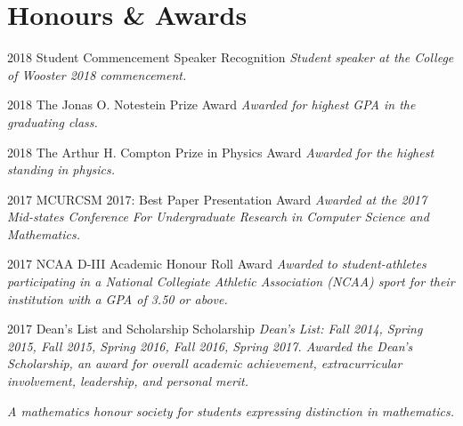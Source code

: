 \documentclass[]{friggeri-cv}
\begin{document}
\section{Honours \& Awards}
\begin{entrylist}

    \entry
    {2018}
    {Student Commencement Speaker }
    {Recognition}
    {\emph{Student speaker at the College of Wooster 2018 commencement.\\}}
         \end{entrylist}
\begin{entrylist}
    \entry
    {2018}
    {The Jonas O. Notestein Prize}
    {Award}
    {\emph{Awarded for highest GPA in the graduating class.\\}}


    \entry
    {2018}
    {The Arthur H. Compton Prize in Physics}
    {Award}
    {\emph{Awarded for the highest standing in physics.\\}}

    \entry
    {2017}
    {MCURCSM 2017: Best Paper Presentation}
    {Award}
    {\emph{Awarded at the 2017 Mid-states Conference For Undergraduate Research in Computer Science and Mathematics.\\}}

    \entry
    {2017}
    {NCAA D-III Academic Honour Roll}
    {Award}
    { \emph{Awarded to student-athletes participating in a National Collegiate Athletic Association (NCAA) sport for their institution with a GPA of 3.50 or above.}\\}


  \entry
    {2017}
    {Dean's List and Scholarship}
    {Scholarship}
    { \emph{Dean's List: Fall 2014, Spring 2015, Fall 2015, Spring 2016, Fall 2016, Spring 2017. Awarded the Dean's Scholarship, an award for overall academic achievement, extracurricular involvement, leadership, and personal merit.}\\}




    {\emph{A mathematics honour society for students expressing distinction in mathematics.\\}}


\end{entrylist}
\end{document}
